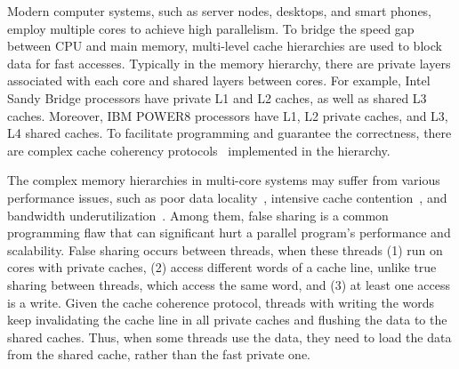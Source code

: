 Modern computer systems, such as server nodes, desktops, and smart phones, employ multiple cores to achieve high parallelism. 
To bridge the speed gap between CPU and main memory, multi-level cache hierarchies are used to block data for fast accesses. Typically in the memory hierarchy, there are private layers associated with each core and shared layers between cores. For example, Intel Sandy Bridge processors have private L1 and L2 caches, as well as shared L3 caches. Moreover, IBM POWER8 processors have L1, L2 private caches, and L3, L4 shared caches.
To facilitate programming and guarantee the correctness, there are complex cache coherency protocols~\cite{MESI} implemented in the hierarchy.

The complex memory hierarchies in multi-core systems may suffer from various performance issues, such as poor data locality~\cite{ibs-sc,ibs-ispass}, intensive cache contention~\cite{ibs-sc2}, and bandwidth underutilization~\cite{Dramon}. Among them, false sharing is a common programming flaw that can significant hurt a parallel program's performance and scalability. %
False sharing occurs between threads, when these threads (1) run on cores with private caches, (2) access different words of a cache line, unlike true sharing between threads, which access the same word, and (3) at least one access is a write. Given the cache coherence protocol, threads with writing the words keep invalidating the cache line in all private caches and flushing the data to the shared caches. Thus, when some threads use the data, they need to load the data from the shared cache, rather than the fast private one.



